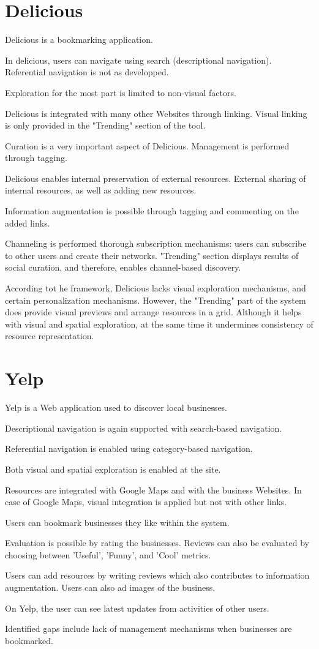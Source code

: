 {\section{Delicious}
Delicious is a bookmarking application. 

In delicious, users can navigate using search (descriptional navigation). Referential navigation is not as developped.

Exploration for the most part is limited to non-visual factors.

Delicious is integrated with many other Websites through linking. Visual linking is only provided in the "Trending" section of the tool.

Curation is a very important aspect of Delicious. Management is performed through tagging. 

Delicious enables internal preservation of external resources. External sharing of internal resources, as well as adding new resources. 

Information augmentation is possible through tagging and commenting on the added links.

Channeling is performed thorough subscription mechanisms: users can subscribe to other users and create their networks. 
"Trending" section displays results of social curation, and therefore, enables channel-based discovery.

According tot he framework, Delicious lacks visual exploration mechanisms, and certain personalization mechanisms. However, the "Trending" part of the system does provide visual previews and arrange resources in a grid. Although it helps with visual and spatial exploration, at the same time it undermines consistency of resource representation. 

} %

{\section{Yelp}
Yelp is a Web application used to discover local businesses. 

Descriptional navigation  is again supported with search-based navigation. 

Referential navigation is enabled using category-based navigation.

Both visual and spatial exploration is enabled at the site. 

Resources are integrated with Google Maps and with the business Websites. In case of Google Maps, visual integration is applied but not with other links.

Users can bookmark businesses they like within the system. 

Evaluation is possible by rating the businesses. Reviews can also be evaluated by choosing between 'Useful', 'Funny', and 'Cool' metrics.

Users can add resources by writing reviews which also contributes to information augmentation. Users can also ad images of the business. 

On Yelp, the user can see latest updates from activities of other users. 

Identified gaps include lack of management mechanisms when businesses are bookmarked.
} %